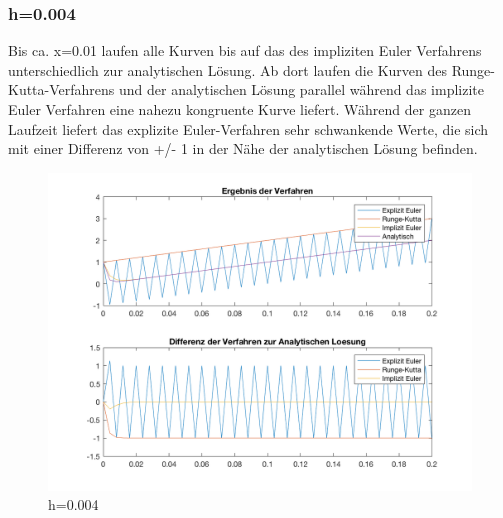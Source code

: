 \documentclass[]{scrartcl}
\begin{document}
\subsubsection{h=0.004}
Bis ca. x=0.01 laufen alle Kurven bis auf das des impliziten Euler Verfahrens unterschiedlich zur analytischen Lösung. Ab dort laufen die Kurven des Runge-Kutta-Verfahrens und der analytischen Lösung parallel während das implizite Euler Verfahren eine nahezu kongruente Kurve liefert. Während der ganzen Laufzeit liefert das explizite Euler-Verfahren sehr schwankende Werte, die sich mit einer Differenz von +/- 1 in der Nähe der analytischen Lösung befinden.
\begin{figure}[H]
	\centering
	\includegraphics[width=1\linewidth]{a1_1_3}
	\caption{h=0.004}
	\label{fig:a1_1_3}
\end{figure}
\end{document}
